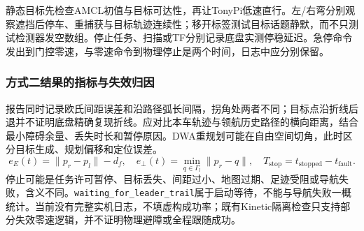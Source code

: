 静态目标先检查AMCL初值与目标可达性，再让TonyPi低速直行。左/右弯分别观察遮挡后停车、重捕获与目标轨迹连续性；移开标签测试目标话题静默，而不只测试检测器发空数组。停止任务、扫描或TF分别记录底盘实测停稳延迟。急停命令发出到门控零速，与零速命令到物理停止是两个时间，日志中应分别保留。

\subsubsection{方式二结果的指标与失效归因}
报告同时记录欧氏间距误差和沿路径弧长间隔，拐角处两者不同；目标点沿折线后退并不证明底盘精确复现折线。应对比本车轨迹与领航历史路径的横向距离，结合最小障碍余量、丢失时长和暂停原因。DWA重规划可能在自由空间切角，此时区分目标生成、规划偏移和定位误差。
\begin{equation}
e_E(t)=\|p_r-p_l\|-d_f,\quad e_\perp(t)=\min_{q\in\Gamma_l}\|p_r-q\|,\quad T_{\mathrm{stop}}=t_{\mathrm{stopped}}-t_{\mathrm{fault}}.
\end{equation}
停止可能是任务许可暂停、目标丢失、间距过小、地图过期、足迹受阻或导航失败，含义不同。\texttt{waiting\_\allowbreak for\_\allowbreak leader\_\allowbreak trail}属于启动等待，不能与导航失败一概统计。当前没有完整实机日志，不填虚构成功率；既有Kinetic隔离检查只支持部分失效零速逻辑，并不证明物理避障或全程跟随成功。
